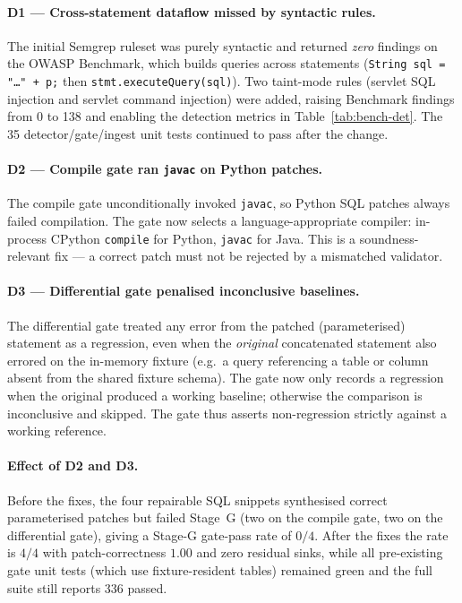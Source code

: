 \documentclass[11pt,a4paper]{article}
\newcommand{\code}[1]{\texttt{\small #1}}
\begin{document}
\paragraph{D1 --- Cross-statement dataflow missed by syntactic rules.}
The initial Semgrep ruleset was purely syntactic and returned
\emph{zero} findings on the OWASP Benchmark, which builds queries across
statements (\code{String sql = "\dots" + p;} then
\code{stmt.executeQuery(sql)}). Two taint-mode rules
(servlet SQL injection and servlet command injection) were added, raising
Benchmark findings from 0 to 138 and enabling the detection metrics in
Table~\ref{tab:bench-det}. The 35 detector/gate/ingest unit tests
continued to pass after the change.

\paragraph{D2 --- Compile gate ran \code{javac} on Python patches.}
The compile gate unconditionally invoked \code{javac}, so Python SQL
patches always failed compilation. The gate now selects a
language-appropriate compiler: in-process CPython \code{compile} for
Python, \code{javac} for Java. This is a soundness-relevant fix --- a
correct patch must not be rejected by a mismatched validator.

\paragraph{D3 --- Differential gate penalised inconclusive baselines.}
The differential gate treated any error from the patched (parameterised)
statement as a regression, even when the \emph{original} concatenated
statement also errored on the in-memory fixture (e.g.\ a query referencing
a table or column absent from the shared fixture schema). The gate now
only records a regression when the original produced a working baseline;
otherwise the comparison is inconclusive and skipped. The gate thus
asserts non-regression strictly against a working reference.

\paragraph{Effect of D2 and D3.} Before the fixes, the four repairable SQL
snippets synthesised correct parameterised patches but failed Stage~G
(two on the compile gate, two on the differential gate), giving a
Stage-G gate-pass rate of $0/4$. After the fixes the rate is $4/4$ with
patch-correctness $1.00$ and zero residual sinks, while all pre-existing
gate unit tests (which use fixture-resident tables) remained green and the
full suite still reports 336 passed.
\end{document}
